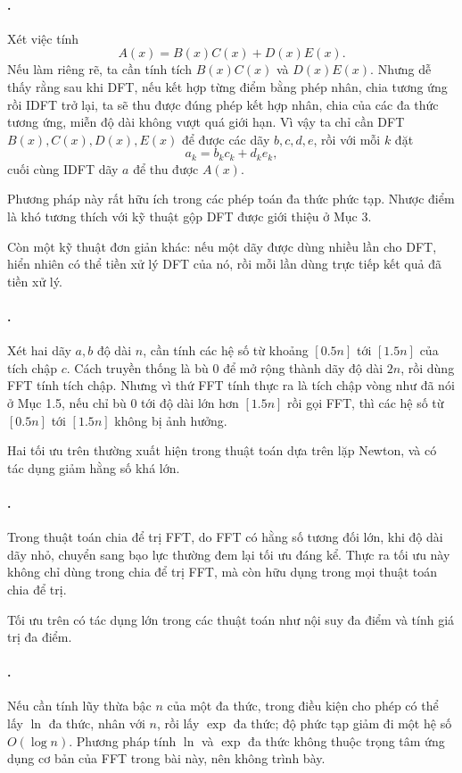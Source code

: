 \documentclass[11pt]{article}
\begin{document}
\paragraph{.}
Xét việc tính
\[
  A(x)=B(x)C(x)+D(x)E(x).
\]
Nếu làm riêng rẽ, ta cần tính tích \(B(x)C(x)\) và \(D(x)E(x)\). Nhưng dễ
thấy rằng sau khi DFT, nếu kết hợp từng điểm bằng phép nhân, chia tương ứng
rồi IDFT trở lại, ta sẽ thu được đúng phép kết hợp nhân, chia của các đa thức
tương ứng, miễn độ dài không vượt quá giới hạn. Vì vậy ta chỉ cần DFT
\(B(x),C(x),D(x),E(x)\) để được các dãy \(b,c,d,e\), rồi với mỗi \(k\) đặt
\[
  a_k=b_kc_k+d_ke_k,
\]
cuối cùng IDFT dãy \(a\) để thu được \(A(x)\).

Phương pháp này rất hữu ích trong các phép toán đa thức phức tạp. Nhược điểm
là khó tương thích với kỹ thuật gộp DFT được giới thiệu ở Mục 3.

Còn một kỹ thuật đơn giản khác: nếu một dãy được dùng nhiều lần cho DFT, hiển
nhiên có thể tiền xử lý DFT của nó, rồi mỗi lần dùng trực tiếp kết quả đã
tiền xử lý.

\paragraph{.}
Xét hai dãy \(a,b\) độ dài \(n\), cần tính các hệ số từ khoảng \([0.5n]\) tới
\([1.5n]\) của tích chập \(c\). Cách truyền thống là bù \(0\) để mở rộng thành
dãy độ dài \(2n\), rồi dùng FFT tính tích chập. Nhưng vì thứ FFT tính thực ra
là tích chập vòng như đã nói ở Mục 1.5, nếu chỉ bù \(0\) tới độ dài lớn hơn
\([1.5n]\) rồi gọi FFT, thì các hệ số từ \([0.5n]\) tới \([1.5n]\) không bị
ảnh hưởng.

Hai tối ưu trên thường xuất hiện trong thuật toán dựa trên lặp Newton, và có
tác dụng giảm hằng số khá lớn.

\paragraph{.}
Trong thuật toán chia để trị FFT, do FFT có hằng số tương đối lớn, khi độ dài
dãy nhỏ, chuyển sang bạo lực thường đem lại tối ưu đáng kể. Thực ra tối ưu
này không chỉ dùng trong chia để trị FFT, mà còn hữu dụng trong mọi thuật toán
chia để trị.

Tối ưu trên có tác dụng lớn trong các thuật toán như nội suy đa điểm và tính
giá trị đa điểm.

\paragraph{.}
Nếu cần tính lũy thừa bậc \(n\) của một đa thức, trong điều kiện cho phép có
thể lấy \(\ln\) đa thức, nhân với \(n\), rồi lấy \(\exp\) đa thức; độ phức tạp
giảm đi một hệ số \(O(\log n)\). Phương pháp tính \(\ln\) và \(\exp\) đa thức
không thuộc trọng tâm ứng dụng cơ bản của FFT trong bài này, nên không trình
bày.
\end{document}
